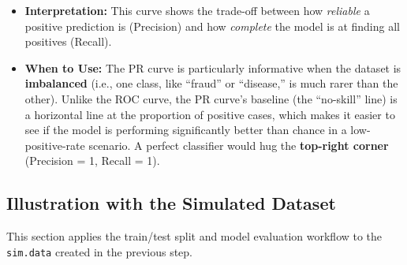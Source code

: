 \documentclass[
  letterpaper,
  DIV=11,
  numbers=noendperiod]{scrreprt}
\providecommand{\tightlist}{%
  \setlength{\itemsep}{0pt}\setlength{\parskip}{0pt}}\usepackage{longtable,booktabs,array}
\begin{document}
\begin{itemize}
  \begin{itemize}
  \tightlist
  \item
    \textbf{Interpretation:} This curve shows the trade-off between how
    \emph{reliable} a positive prediction is (Precision) and how
    \emph{complete} the model is at finding all positives (Recall).
  \item
    \textbf{When to Use:} The PR curve is particularly informative when
    the dataset is \textbf{imbalanced} (i.e., one class, like ``fraud''
    or ``disease,'' is much rarer than the other). Unlike the ROC curve,
    the PR curve's baseline (the ``no-skill'' line) is a horizontal line
    at the proportion of positive cases, which makes it easier to see if
    the model is performing significantly better than chance in a
    low-positive-rate scenario. A perfect classifier would hug the
    \textbf{top-right corner} (Precision = 1, Recall = 1).
  \end{itemize}
\end{itemize}

\subsection{Illustration with the Simulated
Dataset}\label{illustration-with-the-simulated-dataset}

This section applies the train/test split and model evaluation workflow
to the \texttt{sim.data} created in the previous step.
\end{document}
